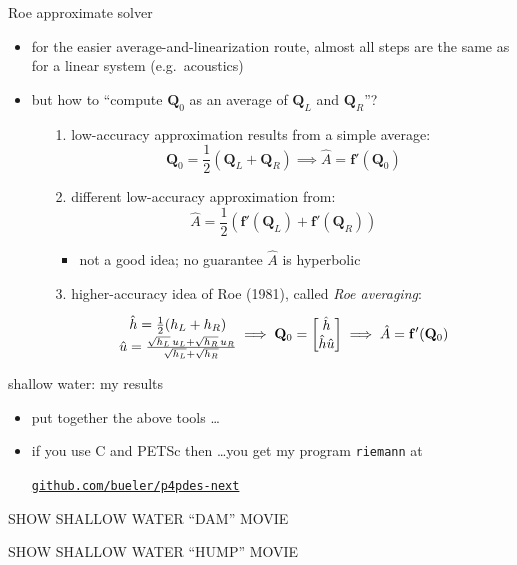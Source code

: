 \documentclass[10pt,dvipsnames,usepdftitle=false,
hyperref={pdftitle = {Finite volume methods},
    pdfauthor = {Ed Bueler}}]{beamer}
\newcommand{\bbf}{\mathbf{f}}
\newcommand{\bQ}{\mathbf{Q}}
\begin{document}
\begin{frame}{Roe approximate solver}

\begin{itemize}
\item for the easier average-and-linearization route, almost all steps are the same as for a linear system (e.g.~acoustics)
\item but how to ``compute $\bQ_0$ as an average of $\bQ_L$ and $\bQ_R$''?
    \begin{itemize}
    \item[1.] low-accuracy approximation results from a simple average:
        $$\bQ_0 = \frac{1}{2} \left(\bQ_L + \bQ_R\right) \implies \hat A = \bbf'(\bQ_0)$$
    \item[2.] different low-accuracy approximation from:
        $$\hat A = \frac{1}{2} \left(\bbf'(\bQ_L) + \bbf'(\bQ_R)\right)$$

        \begin{itemize}
        \item not a good idea; no guarantee $\hat A$ is hyperbolic
        \end{itemize}
    \item[3.] higher-accuracy idea of Roe (1981), called \emph{Roe averaging}:
        $$\begin{matrix} \hat h = \frac{1}{2} (h_L + h_R) {\Large\strut} \\
\hat u = \frac{\sqrt{h_L}\, u_L + \sqrt{h_R}\, u_R}{\sqrt{h_L} + \sqrt{h_R}}
\end{matrix}
\implies \bQ_0 = \begin{bmatrix} \hat h \\ \hat h \hat u \end{bmatrix} \implies \hat A = \bbf'(\bQ_0)$$
    \end{itemize}
\end{itemize}
\end{frame}


\begin{frame}{shallow water: my results}

\begin{itemize}
\item put together the above tools \dots
\item if you use C and PETSc then \dots you get my program \texttt{riemann} at
    \begin{center}
    \href{https://github.com/bueler/p4pdes-next}{\texttt{github.com/bueler/p4pdes-next}}
    \end{center}
\end{itemize}

\vspace{10mm}
\begin{center}
\alert{SHOW SHALLOW WATER ``DAM'' MOVIE}

\bigskip
\alert{SHOW SHALLOW WATER ``HUMP'' MOVIE}
\end{center}
\end{frame}
\end{document}
